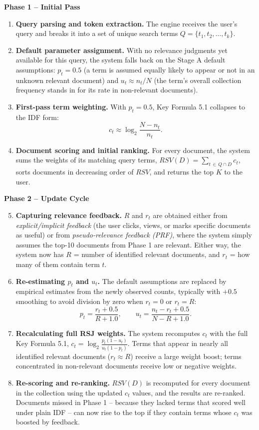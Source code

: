 \documentclass[11pt, a4paper]{article}
\begin{document}
\begin{defbox}
\textbf{Phase 1 -- Initial Pass}
\begin{enumerate}
\item \textbf{Query parsing and token extraction.} The engine receives the user's query and breaks it into a set of unique search terms $Q = \{t_1, t_2, \dots, t_k\}$.
\item \textbf{Default parameter assignment.} With no relevance judgments yet available for this query, the system falls back on the Stage A default assumptions: $p_t = 0.5$ (a term is assumed equally likely to appear or not in an unknown relevant document) and $u_t \approx n_t/N$ (the term's overall collection frequency stands in for its rate in non-relevant documents).
\item \textbf{First-pass term weighting.} With $p_t=0.5$, Key Formula 5.1 collapses to the IDF form:
\[
c_t \approx \log_2 \frac{N - n_t}{n_t}.
\]
\item \textbf{Document scoring and initial ranking.} For every document, the system sums the weights of its matching query terms, $RSV(D) = \sum_{t\,\in\,Q\cap D} c_t$, sorts documents in decreasing order of $RSV$, and returns the top $K$ to the user.
\end{enumerate}

\textbf{Phase 2 -- Update Cycle}
\begin{enumerate}
\setcounter{enumi}{4}
\item \textbf{Capturing relevance feedback.} $R$ and $r_t$ are obtained either from \emph{explicit/implicit feedback} (the user clicks, views, or marks specific documents as useful) or from \emph{pseudo-relevance feedback (PRF)}, where the system simply assumes the top-10 documents from Phase 1 are relevant. Either way, the system now has $R$ = number of identified relevant documents, and $r_t$ = how many of them contain term $t$.
\item \textbf{Re-estimating $p_t$ and $u_t$.} The default assumptions are replaced by empirical estimates from the newly observed counts, typically with $+0.5$ smoothing to avoid division by zero when $r_t=0$ or $r_t=R$:
\[
p_t = \frac{r_t + 0.5}{R + 1.0}, \qquad u_t = \frac{n_t - r_t + 0.5}{N - R + 1.0}.
\]
\item \textbf{Recalculating full RSJ weights.} The system recomputes $c_t$ with the full Key Formula 5.1, $c_t = \log_2\frac{p_t(1-u_t)}{u_t(1-p_t)}$. Terms that appear in nearly all identified relevant documents ($r_t \approx R$) receive a large weight boost; terms concentrated in non-relevant documents receive low or negative weights.
\item \textbf{Re-scoring and re-ranking.} $RSV(D)$ is recomputed for every document in the collection using the updated $c_t$ values, and the results are re-ranked. Documents missed in Phase 1 -- because they lacked terms that scored well under plain IDF -- can now rise to the top if they contain terms whose $c_t$ was boosted by feedback.
\end{enumerate}
\end{defbox}
\end{document}
